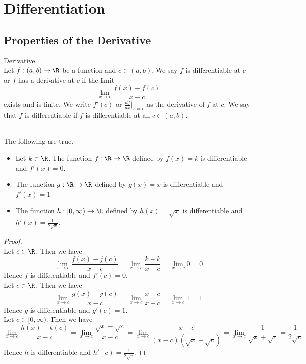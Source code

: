 \documentclass[a4paper]{article}
\begin{document}
\pagebreak
\section{Differentiation}
\subsection{Properties of the Derivative}
\begin{defn}{Derivative}{}\\ Let $f:(a,b)\to\R$ be a function and $c\in(a,b)$. We say $f$ is differentiable at $c$ or $f$ has a derivative at $c$ if the limit $$\lim_{x\to c}\frac{f(x)-f(c)}{x-c}$$ exists and is finite. We write $f'(c)$ or $\frac{df}{dx}\vert_{x=c}$ as the derivative of $f$ at $c$. We say that $f$ is differentiable if $f$ is differentiable at all $c\in(a,b)$. 
\end{defn}

\begin{eg}{}{}\\
The following are true. 
\begin{itemize}
\item Let $k\in\R$. The function $f:\R\to\R$ defined by $f(x)=k$ is differentiable and $f'(x)=0$. 
\item The function $g:\R\to\R$ defined by $g(x)=x$ is differentiable and $f'(x)=1$. 
\item The function $h:[0,\infty)\to\R$ defined by $h(x)=\sqrt{x}$ is differentiable and $h'(x)=\frac{1}{2\sqrt{x}}$. 
\end{itemize}
\begin{proof}\\
Let $c\in\R$. Then we have $$\lim_{x\to c}\frac{f(x)-f(c)}{x-c}=\lim_{x\to c}\frac{k-k}{x-c}=\lim_{x\to c}0=0$$ Hence $f$ is differentiable and $f'(c)=0$. \\

Let $c\in\R$. Then we have $$\lim_{x\to c}\frac{g(x)-g(c)}{x-c}=\lim_{x\to c}\frac{x-c}{x-c}=\lim_{x\to c}1=1$$ Hence $g$ is differentiable and $g'(c)=1$. \\

Let $c\in[0,\infty)$. Then we have $$\lim_{x\to c}\frac{h(x)-h(c)}{x-c}=\lim_{x\to c}\frac{\sqrt{x}-\sqrt{c}}{x-c}=\lim_{x\to c}\frac{x-c}{(x-c)(\sqrt{x}+\sqrt{c})}=\lim_{x\to c}\frac{1}{\sqrt{x}+\sqrt{c}}=\frac{1}{2\sqrt{c}}$$ Hence $h$ is differentiable and $h'(c)=\frac{1}{2\sqrt{c}}$. 
\end{proof}
\end{eg}
\end{document}
